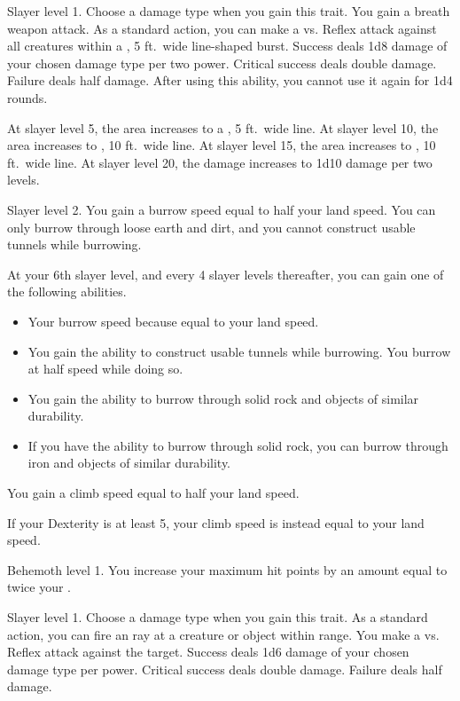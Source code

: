     \featpre Slayer level 1.
     Choose a damage type when you gain this trait.
    \featben You gain a breath weapon attack.
    As a standard action, you can make a  vs. Reflex attack against all creatures within a \areamed, 5 ft.\ wide line-shaped burst.
    Success deals 1d8 damage of your chosen damage type per two power.
    Critical success deals double damage.
    Failure deals half damage.
    After using this ability, you cannot use it again for 1d4 rounds.

    At slayer level 5, the area increases to a \arealarge, 5 ft.\ wide line.
    At slayer level 10, the area increases to \arealarge, 10 ft.\ wide line.
    At slayer level 15, the area increases to \areahuge, 10 ft.\ wide line.
    At slayer level 20, the damage increases to 1d10 damage per two levels.

    \featpre Slayer level 2.
    \featben You gain a burrow speed equal to half your land speed.
    You can only burrow through loose earth and dirt, and you cannot construct usable tunnels while burrowing.

    At your 6th slayer level, and every 4 slayer levels thereafter, you can gain one of the following abilities.
    \begin{itemize}
        \item Your burrow speed because equal to your land speed.
        \item You gain the ability to construct usable tunnels while burrowing.
            You burrow at half speed while doing so.
        \item You gain the ability to burrow through solid rock and objects of similar durability.
        \item If you have the ability to burrow through solid rock, you can burrow through iron and objects of similar durability.
    \end{itemize}

    \featben You gain a climb speed equal to half your land speed.

    If your Dexterity is at least 5, your climb speed is instead equal to your land speed.

    \featpre Behemoth level 1.
    \featben You increase your maximum hit points by an amount equal to twice your .

    \featpre Slayer level 1.
     Choose a damage type when you gain this trait.
    \featben As a standard action, you can fire an ray at a creature or object within \rngclose range.
    You make a  vs. Reflex attack against the target.
    Success deals 1d6 damage of your chosen damage type per power.
    Critical success deals double damage.
    Failure deals half damage.

